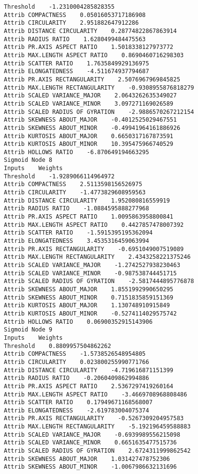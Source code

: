 \documentclass[
	article,			%
	11pt,				%
	oneside,			%
	a4paper,			%
	english,			%
	brazil,				%
	sumario=tradicional
	]{abntex2}
\begin{document}
\begin{lstlisting}
Threshold    -1.2310004285828355
Attrib COMPACTNESS    0.05016053717186908
Attrib CIRCULARITY    2.951882647912286
Attrib DISTANCE CIRCULARITY    0.28774822867863914
Attrib RADIUS RATIO    1.6280499484475563
Attrib PR.AXIS ASPECT RATIO    1.5018338127973772
Attrib MAX.LENGTH ASPECT RATIO    0.8690460716298303
Attrib SCATTER RATIO    1.7635849929136975
Attrib ELONGATEDNESS    -4.511674937794687
Attrib PR.AXIS RECTANGULARITY    2.5076967969845825
Attrib MAX.LENGTH RECTANGULARITY    -0.9308955876818279
Attrib SCALED VARIANCE_MAJOR    2.0643262635349027
Attrib SCALED VARIANCE_MINOR    3.097271169026589
Attrib SCALED RADIUS OF GYRATION    -2.9886570267212154
Attrib SKEWNESS ABOUT_MAJOR    -0.4012525029467551
Attrib SKEWNESS ABOUT_MINOR    -0.49941964161886926
Attrib KURTOSIS ABOUT_MAJOR    0.6650317167873591
Attrib KURTOSIS ABOUT_MINOR    10.395475966740529
Attrib HOLLOWS RATIO    -6.870649194663295
Sigmoid Node 8
Inputs    Weights
Threshold    -1.9289066114964972
Attrib COMPACTNESS    2.5113598156526975
Attrib CIRCULARITY    -1.4773829608959563
Attrib DISTANCE CIRCULARITY    1.952080816559919
Attrib RADIUS RATIO    -1.0884595888277968
Attrib PR.AXIS ASPECT RATIO    1.0095863958800841
Attrib MAX.LENGTH ASPECT RATIO    0.4427857478007392
Attrib SCATTER RATIO    -1.5915395195362094
Attrib ELONGATEDNESS    3.4535316459063994
Attrib PR.AXIS RECTANGULARITY    -0.6951049007519089
Attrib MAX.LENGTH RECTANGULARITY    2.4343258221375246
Attrib SCALED VARIANCE_MAJOR    -1.2742527938230463
Attrib SCALED VARIANCE_MINOR    -0.987538744451715
Attrib SCALED RADIUS OF GYRATION    -2.5817444895776878
Attrib SKEWNESS ABOUT_MAJOR    1.8551992990650295
Attrib SKEWNESS ABOUT_MINOR    0.7151835859151369
Attrib KURTOSIS ABOUT_MAJOR    1.130748910915849
Attrib KURTOSIS ABOUT_MINOR    -0.5274114029575742
Attrib HOLLOWS RATIO    0.06900352915143906
Sigmoid Node 9
Inputs    Weights
Threshold    0.8809957504862262
Attrib COMPACTNESS    -1.5738526548954805
Attrib CIRCULARITY    0.023800255990771766
Attrib DISTANCE CIRCULARITY    -4.719616871151399
Attrib RADIUS RATIO    -0.2060409862994886
Attrib PR.AXIS ASPECT RATIO    2.5367297419260164
Attrib MAX.LENGTH ASPECT RATIO    -3.4669708968808486
Attrib SCATTER RATIO    0.17949671168568007
Attrib ELONGATEDNESS    -2.619783004075374
Attrib PR.AXIS RECTANGULARITY    -0.5267309204957583
Attrib MAX.LENGTH RECTANGULARITY    -5.192196459588883
Attrib SCALED VARIANCE_MAJOR    -0.6939989556215098
Attrib SCALED VARIANCE_MINOR    0.6651635477515736
Attrib SCALED RADIUS OF GYRATION    2.6724311999862542
Attrib SKEWNESS ABOUT_MAJOR    1.031427478752306
Attrib SKEWNESS ABOUT_MINOR    -1.0067986632131696

\end{lstlisting}
\end{document}
